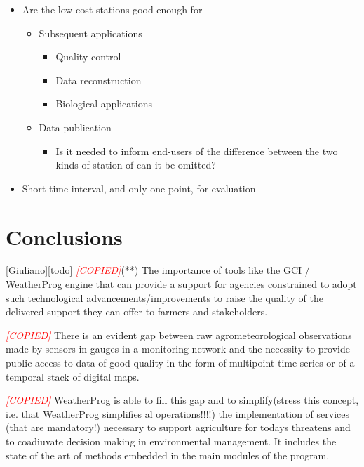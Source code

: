 \documentclass[authoryear,preprint,review,12pt]{elsarticle}
\newcommand{\note}[1]{\emph{\textcolor{red}{#1}}}
\begin{document}
\begin{itemize}
    \item Are the low-cost stations good enough for
    \begin{itemize}
        \item Subsequent applications
        \begin{itemize}
            \item Quality control
            \item Data reconstruction
            \item Biological applications
        \end{itemize}
        \item Data publication
        \begin{itemize}
            \item Is it needed to inform end-users of the difference between the two kinds of station of can it be omitted?
        \end{itemize}
    \end{itemize}
    \item Short time interval, and only one point, for evaluation
\end{itemize}

\section{Conclusions}[Giuliano][todo]
\note{[COPIED]}(**) The importance of tools like the GCI / WeatherProg engine that can provide a support for agencies constrained to adopt such technological advancements/improvements to raise the quality of the delivered support they can offer to farmers and stakeholders.

\note{[COPIED]} There is an evident gap between raw agrometeorological observations made by sensors in gauges in a monitoring network and the necessity to provide public access to data of good quality in the form of multipoint time series or of a temporal stack of digital maps.

\note{[COPIED]} WeatherProg is able to fill this gap and to simplify(stress this concept, i.e. that WeatherProg simplifies al operations!!!!) the implementation of services (that are mandatory!) necessary to support agriculture for todays threatens and to coadiuvate decision making in environmental management. It includes the state of the art of methods embedded in the main modules of the program.

\end{document}

